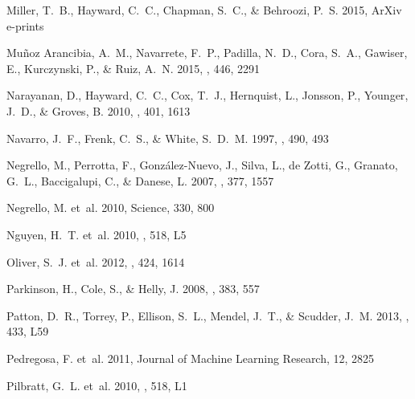 \documentclass[iop]{emulateapj}
\begin{document}
\begin{thebibliography}{106}
{Miller}, T.~B., {Hayward}, C.~C., {Chapman}, S.~C., \& {Behroozi}, P.~S. 2015,
  ArXiv e-prints

{Mu{\~n}oz Arancibia}, A.~M., {Navarrete}, F.~P., {Padilla}, N.~D., {Cora},
  S.~A., {Gawiser}, E., {Kurczynski}, P., \& {Ruiz}, A.~N. 2015, \mnras, 446,
  2291

{Narayanan}, D., {Hayward}, C.~C., {Cox}, T.~J., {Hernquist}, L., {Jonsson},
  P., {Younger}, J.~D., \& {Groves}, B. 2010, \mnras, 401, 1613

{Navarro}, J.~F., {Frenk}, C.~S., \& {White}, S.~D.~M. 1997, \apj, 490, 493

{Negrello}, M., {Perrotta}, F., {Gonz{\'a}lez-Nuevo}, J., {Silva}, L., {de
  Zotti}, G., {Granato}, G.~L., {Baccigalupi}, C., \& {Danese}, L. 2007,
  \mnras, 377, 1557

{Negrello}, M. {et~al.} 2010, Science, 330, 800

{Nguyen}, H.~T. {et~al.} 2010, \aap, 518, L5

{Oliver}, S.~J. {et~al.} 2012, \mnras, 424, 1614

{Parkinson}, H., {Cole}, S., \& {Helly}, J. 2008, \mnras, 383, 557

{Patton}, D.~R., {Torrey}, P., {Ellison}, S.~L., {Mendel}, J.~T., \& {Scudder},
  J.~M. 2013, \mnras, 433, L59

{Pedregosa}, F. {et~al.} 2011, {Journal of Machine Learning Research}, 12, 2825

{Pilbratt}, G.~L. {et~al.} 2010, \aap, 518, L1


\end{thebibliography}
\end{document}

